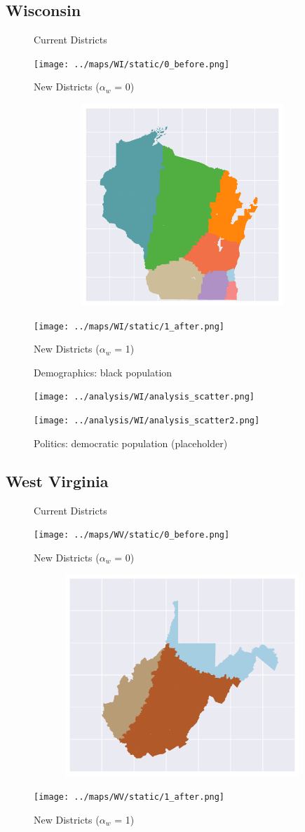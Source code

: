 \subsection{Wisconsin}
\begin{figure}[htb!] \centering
\caption{ Current Districts }
\texttt{[image: ../maps/WI/static/0\_before.png]}
\caption{ New Districts ($\alpha_w$ = 0) }
\includegraphics[width=5in,height=3in,keepaspectratio]{../maps/WI/static/0_after.png}
\caption{ New Districts ($\alpha_w$ = 1) }
\texttt{[image: ../maps/WI/static/1\_after.png]}
\end{figure}

\clearpage
\newpage

\begin{figure}[htb!] \centering
\caption{ Demographics: black population }
\texttt{[image: ../analysis/WI/analysis\_scatter.png]}
\caption{ Politics: democratic population (placeholder)}
\texttt{[image: ../analysis/WI/analysis\_scatter2.png]}
\end{figure}

\clearpage
\newpage

\subsection{West Virginia}
\begin{figure}[htb!] \centering
\caption{ Current Districts }
\texttt{[image: ../maps/WV/static/0\_before.png]}
\caption{ New Districts ($\alpha_w$ = 0) }
\includegraphics[width=5in,height=3in,keepaspectratio]{../maps/WV/static/0_after.png}
\caption{ New Districts ($\alpha_w$ = 1) }
\texttt{[image: ../maps/WV/static/1\_after.png]}
\end{figure}

